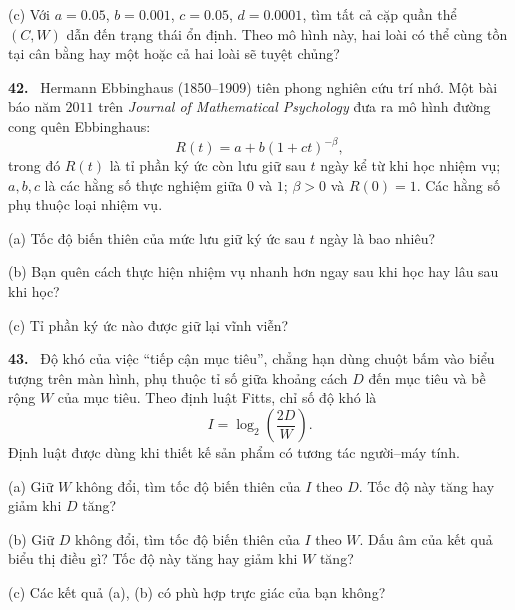 \documentclass[12pt,a4paper]{article}
\newcommand{\bt}[1]{\par\smallskip\noindent\textbf{#1.}\ }
\begin{document}
(c) Với $a=0.05$, $b=0.001$, $c=0.05$, $d=0.0001$, tìm tất cả cặp quần thể $(C,W)$ dẫn đến trạng thái ổn định. Theo mô hình này, hai loài có thể cùng tồn tại cân bằng hay một hoặc cả hai loài sẽ tuyệt chủng?
\par\medskip\noindent\begin{minipage}{\linewidth}
\bt{42} Hermann Ebbinghaus (1850–1909) tiên phong nghiên cứu trí nhớ. Một bài báo năm $2011$ trên \textit{Journal of Mathematical Psychology} đưa ra mô hình đường cong quên Ebbinghaus:
\[R(t)=a+b(1+ct)^{-\beta},\]
trong đó $R(t)$ là tỉ phần ký ức còn lưu giữ sau $t$ ngày kể từ khi học nhiệm vụ; $a,b,c$ là các hằng số thực nghiệm giữa $0$ và $1$; $\beta>0$ và $R(0)=1$. Các hằng số phụ thuộc loại nhiệm vụ.

(a) Tốc độ biến thiên của mức lưu giữ ký ức sau $t$ ngày là bao nhiêu?

(b) Bạn quên cách thực hiện nhiệm vụ nhanh hơn ngay sau khi học hay lâu sau khi học?

(c) Tỉ phần ký ức nào được giữ lại vĩnh viễn?
\end{minipage}\par\medskip
\bt{43} Độ khó của việc “tiếp cận mục tiêu”, chẳng hạn dùng chuột bấm vào biểu tượng trên màn hình, phụ thuộc tỉ số giữa khoảng cách $D$ đến mục tiêu và bề rộng $W$ của mục tiêu. Theo định luật Fitts, chỉ số độ khó là
\[I=\log_2\left(\frac{2D}{W}\right).\]
Định luật được dùng khi thiết kế sản phẩm có tương tác người–máy tính.

(a) Giữ $W$ không đổi, tìm tốc độ biến thiên của $I$ theo $D$. Tốc độ này tăng hay giảm khi $D$ tăng?

(b) Giữ $D$ không đổi, tìm tốc độ biến thiên của $I$ theo $W$. Dấu âm của kết quả biểu thị điều gì? Tốc độ này tăng hay giảm khi $W$ tăng?

(c) Các kết quả (a), (b) có phù hợp trực giác của bạn không?
\end{document}
